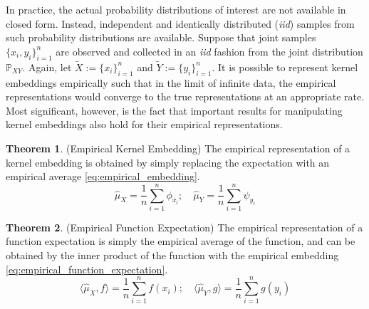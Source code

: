 \documentclass[twoside]{article} \usepackage{aistats2017}
\theoremstyle{definition}
\newtheorem{theorem}{Theorem}[section]
\newcommand{\rv}[1]{{#1}}
\newcommand{\ds}[1]{\tilde{#1}}
\newcommand{\inner}[2]{{\langle #1, #2 \rangle}}
\newcommand{\hatmuX}{\hat{\mu}_{\rv{X}}}
\newcommand{\hatmuY}{\hat{\mu}_{\rv{Y}}}
\begin{document}
			In practice, the actual probability distributions of interest are not available in closed form. Instead, independent and identically distributed (\textit{iid}) samples from such probability distributions are available. Suppose that joint samples $\{x_{i}, y_{i}\}_{i = 1}^{n}$ are observed and collected in an \textit{iid} fashion from the joint distribution $\mathbb{P}_{\rv{X} \rv{Y}}$. Again, let $\ds{X} := \{x_{i}\}_{i = 1}^{n}$ and $\ds{Y} := \{y_{i}\}_{i = 1}^{n}$. It is possible to represent kernel embeddings empirically such that in the limit of infinite data, the empirical representations would converge to the true representations at an appropriate rate. Most significant, however, is the fact that important results for manipulating kernel embeddings also hold for their empirical representations.
			
			\begin{theorem} \label{thm:empirical_embedding}
				(Empirical Kernel Embedding)
				The empirical representation of a kernel embedding is obtained by simply replacing the expectation with an empirical average \eqref{eq:empirical_embedding}.
				\begin{equation}
					\hatmuX = \frac{1}{n} \sum_{i = 1}^{n} \phi_{x_{i}} ;\quad \hatmuY = \frac{1}{n} \sum_{i = 1}^{n} \psi_{y_{i}}
				\label{eq:empirical_embedding}
				\end{equation}
			\end{theorem}
	
			\begin{theorem} \label{thm:empirical_function_expectation}
				(Empirical Function Expectation)
				The empirical representation of a function expectation is simply the empirical average of the function, and can be obtained by the inner product of the function with the empirical embedding \eqref{eq:empirical_function_expectation}.
				\begin{equation}
					\inner{\hatmuX}{f} = \frac{1}{n} \sum_{i = 1}^{n} f(x_{i}) ;\quad \inner{\hatmuY}{g} = \frac{1}{n} \sum_{i = 1}^{n} g(y_{i})
				\label{eq:empirical_function_expectation}
				\end{equation}
			\end{theorem}
		
\end{document}
